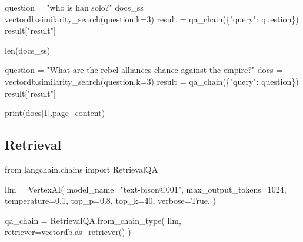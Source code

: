 \documentclass[
  letterpaper,
  DIV=11,
  numbers=noendperiod]{scrreprt}
\newenvironment{Shaded}{\begin{snugshade}}{\end{snugshade}}
\newcommand{\BuiltInTok}[1]{\textcolor[rgb]{0.00,0.23,0.31}{#1}}
\newcommand{\DecValTok}[1]{\textcolor[rgb]{0.68,0.00,0.00}{#1}}
\newcommand{\FloatTok}[1]{\textcolor[rgb]{0.68,0.00,0.00}{#1}}
\newcommand{\ImportTok}[1]{\textcolor[rgb]{0.00,0.46,0.62}{#1}}
\newcommand{\NormalTok}[1]{\textcolor[rgb]{0.00,0.23,0.31}{#1}}
\newcommand{\OperatorTok}[1]{\textcolor[rgb]{0.37,0.37,0.37}{#1}}
\newcommand{\StringTok}[1]{\textcolor[rgb]{0.13,0.47,0.30}{#1}}
\newcommand{\VariableTok}[1]{\textcolor[rgb]{0.07,0.07,0.07}{#1}}
\begin{document}
\begin{Shaded}
\begin{Highlighting}[]
\NormalTok{question }\OperatorTok{=} \StringTok{"who is han solo?"}
\NormalTok{docs\_ss }\OperatorTok{=}\NormalTok{ vectordb.similarity\_search(question,k}\OperatorTok{=}\DecValTok{3}\NormalTok{)}
\NormalTok{result }\OperatorTok{=}\NormalTok{ qa\_chain(\{}\StringTok{"query"}\NormalTok{: question\})}
\NormalTok{result[}\StringTok{"result"}\NormalTok{]}
\end{Highlighting}
\end{Shaded}

\begin{Shaded}
\begin{Highlighting}[]
\BuiltInTok{len}\NormalTok{(docs\_ss)}
\end{Highlighting}
\end{Shaded}

\begin{Shaded}
\begin{Highlighting}[]
\NormalTok{question }\OperatorTok{=} \StringTok{"What are the rebel alliance\textquotesingle{}s chance against the empire?"}
\NormalTok{docs }\OperatorTok{=}\NormalTok{ vectordb.similarity\_search(question,k}\OperatorTok{=}\DecValTok{3}\NormalTok{)}
\NormalTok{result }\OperatorTok{=}\NormalTok{ qa\_chain(\{}\StringTok{"query"}\NormalTok{: question\})}
\NormalTok{result[}\StringTok{"result"}\NormalTok{]}
\end{Highlighting}
\end{Shaded}

\begin{Shaded}
\begin{Highlighting}[]
\BuiltInTok{print}\NormalTok{(docs[}\DecValTok{1}\NormalTok{].page\_content)}
\end{Highlighting}
\end{Shaded}

\hypertarget{retrieval}{%
\subsection{Retrieval}\label{retrieval}}

\begin{Shaded}
\begin{Highlighting}[]
\ImportTok{from}\NormalTok{ langchain.chains }\ImportTok{import}\NormalTok{ RetrievalQA}

\NormalTok{llm }\OperatorTok{=}\NormalTok{ VertexAI(}
\NormalTok{    model\_name}\OperatorTok{=}\StringTok{"text{-}bison@001"}\NormalTok{,}
\NormalTok{    max\_output\_tokens}\OperatorTok{=}\DecValTok{1024}\NormalTok{,}
\NormalTok{    temperature}\OperatorTok{=}\FloatTok{0.1}\NormalTok{,}
\NormalTok{    top\_p}\OperatorTok{=}\FloatTok{0.8}\NormalTok{,}
\NormalTok{    top\_k}\OperatorTok{=}\DecValTok{40}\NormalTok{,}
\NormalTok{    verbose}\OperatorTok{=}\VariableTok{True}\NormalTok{,}
\NormalTok{)}

\NormalTok{qa\_chain }\OperatorTok{=}\NormalTok{ RetrievalQA.from\_chain\_type(}
\NormalTok{    llm,}
\NormalTok{    retriever}\OperatorTok{=}\NormalTok{vectordb.as\_retriever()}
\NormalTok{)}
\end{Highlighting}
\end{Shaded}
\end{document}

